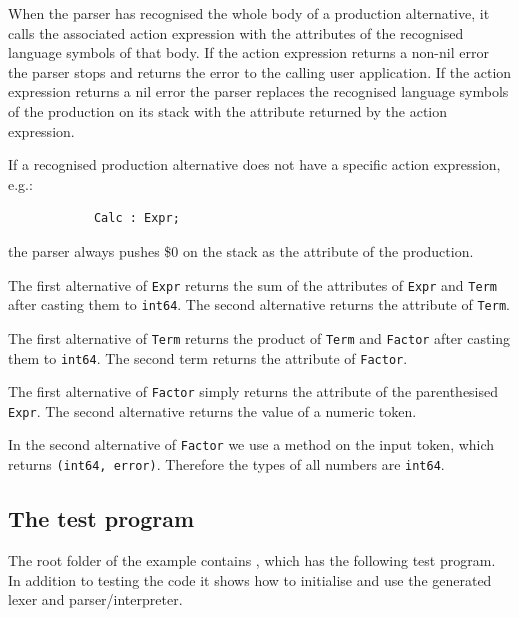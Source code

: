 \documentclass[12pt]{article}
\begin{document}
		When the parser has recognised the whole body of a production alternative, it calls the associated action expression with the attributes of the recognised language symbols of that body. If the action expression returns a non-nil error the parser stops and returns the error to the calling user application. If the action expression returns a nil error the parser replaces the recognised language symbols of the production on its stack with the attribute returned by the action expression.

		If a recognised production alternative does not have a specific action expression, e.g.: 
		\begin{verbatim}
			Calc : Expr;
		\end{verbatim}

		the parser always pushes \$0 on the stack as the attribute of the production.

		The first alternative of \verb|Expr| returns the sum of the attributes of \verb|Expr| and \verb|Term| after casting them to \verb|int64|. The second alternative returns the attribute of \verb|Term|.

		The first alternative of \verb|Term| returns the product of \verb|Term| and \verb|Factor| after casting them to \verb|int64|. The second term returns the attribute of \verb|Factor|.

		The first alternative of \verb|Factor| simply returns the attribute of the parenthesised \verb|Expr|. The second alternative returns the value of a numeric token.

		In the second alternative of \verb|Factor| we use a method on the input token, which returns 
		\verb|(int64, error)|. Therefore the types of all numbers are \verb|int64|.

	\subsection{The test program}
		The root folder of the  example contains , which has the following test program. In addition to testing the code it shows how to initialise and use the generated lexer and parser/interpreter.
\end{document}

